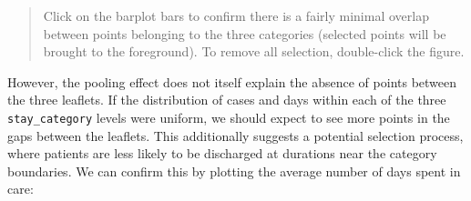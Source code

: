 \documentclass[
]{book}
\newenvironment{Shaded}{\begin{snugshade}}{\end{snugshade}}
\newcommand{\AttributeTok}[1]{\textcolor[rgb]{0.13,0.29,0.53}{#1}}
\newcommand{\CommentTok}[1]{\textcolor[rgb]{0.56,0.35,0.01}{\textit{#1}}}
\newcommand{\ConstantTok}[1]{\textcolor[rgb]{0.56,0.35,0.01}{#1}}
\newcommand{\DecValTok}[1]{\textcolor[rgb]{0.00,0.00,0.81}{#1}}
\newcommand{\FunctionTok}[1]{\textcolor[rgb]{0.13,0.29,0.53}{\textbf{#1}}}
\newcommand{\NormalTok}[1]{#1}
\newcommand{\OtherTok}[1]{\textcolor[rgb]{0.56,0.35,0.01}{#1}}
\newcommand{\SpecialCharTok}[1]{\textcolor[rgb]{0.81,0.36,0.00}{\textbf{#1}}}
\newcommand{\StringTok}[1]{\textcolor[rgb]{0.31,0.60,0.02}{#1}}
\theoremstyle{definition}
\theoremstyle{definition}
\theoremstyle{definition}
\theoremstyle{definition}
\theoremstyle{remark}
\begin{document}
\begin{quote}
Click on the barplot bars to confirm there is a fairly minimal overlap between points belonging to the three categories (selected points will be brought to the foreground). To remove all selection, double-click the figure.
\end{quote}

However, the pooling effect does not itself explain the absence of points between the three leaflets. If the distribution of cases and days within each of the three \texttt{stay\_category} levels were uniform, we should expect to see more points in the gaps between the leaflets. This additionally suggests a potential selection process, where patients are less likely to be discharged at durations near the category boundaries. We can confirm this by plotting the average number of days spent in care:

\begin{Shaded}
\end{Shaded}
\end{document}
